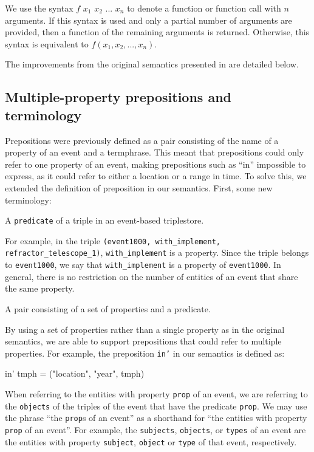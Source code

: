 \documentclass[../main.tex]{subfiles}
\begin{document}
We use the syntax $f$ $x_1$ $x_2$ ... $x_n$ to denote a function or function call with $n$ arguments.  If this syntax is used
and only a partial number of arguments are provided, then a function of the remaining arguments is returned.  Otherwise,
this syntax is equivalent to $f(x_1, x_2, ..., x_n)$.

The improvements from the original semantics presented in
\cite{frost2014demonstration} \cite{frostagboola2014} are detailed below.

\subsection{Multiple-property prepositions and terminology}

Prepositions were previously defined as a pair consisting of the name of a property of an event and a termphrase.  This meant that prepositions could
only refer to one property of an event, making prepositions such as ``in''
impossible to express, as it could refer to either a location or a range in time.
To solve this, we extended the definition of preposition in our semantics.  First, some new terminology:

\begin{definition}[Property]
	A \texttt{predicate} of a triple in an event-based triplestore.
\end{definition}

For example, in the triple \texttt{(event1000, with\_implement, refractor\_telescope\_1)}, \texttt{with\_implement} is a property.  Since the triple belongs to \texttt{event1000}, we say that \texttt{with\_implement} is a property of \texttt{event1000}.  In general, there is no restriction on the number of entities of an event that share the same property.

\begin{definition}[Preposition]
	A pair consisting of a set of properties and a predicate.
\end{definition}

By using a set of properties rather than a single property as in the original semantics, we are able to support prepositions that could refer to multiple properties.
For example, the preposition \texttt{in'} in our semantics is defined as:

\begin{code}
	in' tmph = ({"location", "year"}, tmph)
\end{code}

When referring to the entities with property \texttt{prop} of an event, we are referring to the \texttt{objects} of the triples of the event that have the predicate \texttt{prop}.
We may use the phrase ``the \texttt{prop}s of an event'' as a shorthand for ``the entities with property \texttt{prop} of an event''.
For example, the \texttt{subjects}, \texttt{objects}, or \texttt{types} of an event are the entities with property \texttt{subject}, \texttt{object} or \texttt{type} of that event, respectively.
\end{document}
